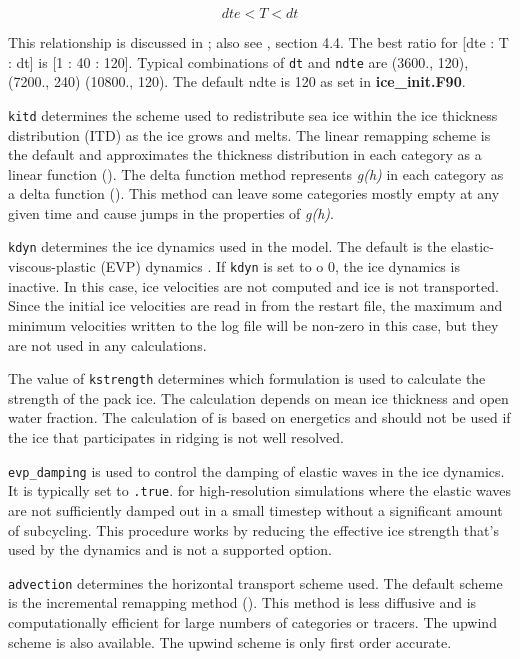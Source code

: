\begin{equation}
 dte < T < dt
\end{equation}

This relationship is discussed in \cite{hunk01}; also see \cite{cice08}, 
section 4.4.  The best ratio for [dte : T : dt] is [1 : 40 : 120]. Typical 
combinations of {\tt dt} and {\tt ndte} are (3600., 120), (7200., 240) 
(10800., 120). The default ndte is 120 as set in {\bf ice\_init.F90}.

{\tt kitd} determines the scheme used to redistribute sea ice within the ice 
thickness distribution (ITD) as the ice grows and melts.  The linear remapping 
scheme is the default and approximates the thickness distribution in each 
category as a linear function (\cite{lips01}).  The delta function method 
represents {\it g(h)} in each category as a delta function (\cite{bitz01}).  
This method can leave some categories mostly empty at any given time and cause 
jumps in the properties of {\it g(h)}.

{\tt kdyn} determines the ice dynamics used in the model.  The default is the
elastic-viscous-plastic (EVP) dynamics \cite{hunk97}.  If {\tt kdyn} is set to o
0, the ice dynamics is inactive. In this case, ice velocities are not computed
and ice is not transported.  Since the initial ice velocities are read in
from the restart file, the maximum and minimum velocities written to the 
log file will be non-zero in this case, but they are not used in any calculations.

The value of {\tt kstrength} determines which formulation is used to
calculate the strength of the pack ice.  The \cite{hibl79} calculation
depends on mean ice thickness and open water fraction.  The calculation
of \cite{roth75b} is based on energetics and should not be used if the
ice that participates in ridging is not well resolved.  

{\tt evp\_damping} is used to control the damping of elastic waves in
the ice dynamics.  It is typically set to {\tt .true}. for high-resolution
simulations where the elastic waves are not sufficiently damped out in a
small timestep without a significant amount of subcycling.  This procedure
works by reducing the effective ice strength that's used by the dynamics
and is not a supported option.

{\tt advection} determines the horizontal transport scheme used. The default
scheme is the incremental remapping method (\cite{lipshunke04}).  This method
is less diffusive and is computationally efficient for large numbers of 
categories or tracers.  The upwind scheme is also available. The upwind scheme 
is only first order accurate.
 
